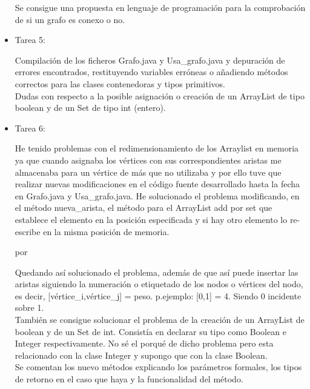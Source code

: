 \begin{itemize}
Se consigue una propuesta en lenguaje de programación para la comprobación de si un grafo es conexo o no. \\

\item Tarea 5:

Compilación de los ficheros Grafo.java y Usa\_grafo.java y depuración de errores encontrados, restituyendo variables erróneas o añadiendo métodos correctos para las clases contenedoras y tipos primitivos.\\

Dudas con respecto a la posible asignación o creación de un ArrayList de tipo boolean y de un Set de tipo int (entero).\\

\item Tarea 6:

He tenido problemas con el redimensionamiento de los Arraylist en memoria ya que cuando asignaba los vértices con sus correspondientes aristas me almacenaba para un vértice de más que no utilizaba y por ello tuve que realizar nuevas modificaciones en el código fuente desarrollado hasta la fecha en Grafo.java y Usa\_grafo.java. He solucionado el problema modificando, en el método nueva\_arista, el método para el ArrayList add por set que establece el elemento en la posición especificada y si hay otro elemento lo re-escribe en la misma posición de memoria.



por



Quedando así solucionado el problema, además de que así puede insertar las aristas siguiendo la numeración o etiquetado de los nodos o vértices del nodo, es decir, [vértice\_i,vértice\_j] = peso. p.ejemplo: [0,1] = 4. Siendo 0 incidente sobre 1.\\

También se consigue solucionar el problema de la creación de un ArrayList de boolean y de un Set de int. Consistía en declarar su tipo como Boolean e Integer respectivamente. No sé el porqué de dicho problema pero esta relacionado con la clase Integer y supongo que con la clase Boolean.\\

Se comentan los nuevo métodos explicando los parámetros formales, los tipos de retorno en el caso que haya y la funcionalidad del método.\\


\end{itemize}
